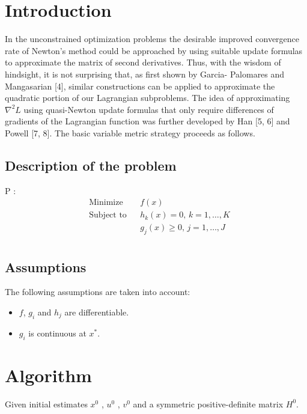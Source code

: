 \documentclass{article}
\begin{document}
\section{Introduction}

In the unconstrained optimization problems the desirable improved convergence rate of Newton’s method could be approached by using suitable update formulas to approximate the matrix of second derivatives. Thus, with the wisdom of hindsight, it is not surprising that, as first shown by Garcia- Palomares and Mangasarian [4], similar constructions can be applied to approximate the quadratic portion of our Lagrangian subproblems. The idea of approximating $\nabla^2L$ using quasi-Newton update formulas that only require differences of gradients of the Lagrangian function was further developed by Han [5, 6] and Powell [7, 8]. The basic variable metric strategy proceeds as follows.

\subsection{Description of the problem}
P : 
\begin{equation*}
    \begin{aligned}
        & \text{Minimize}
        & & f(x) \\
        & \text{Subject to}
        & & h_k(x) = 0, \, k = 1, \ldots, K\\
        &&& g_j(x) \geq 0, \, j = 1, \ldots, J\\
    \end{aligned}
\end{equation*}


\subsection{Assumptions}
The following assumptions are taken into account:
\begin{itemize}
    \item $f$, $g_i$ and $h_j$ are differentiable.
    \item $g_i$ is continuous at $x^*$.
\end{itemize}

\section{Algorithm}

Given initial estimates $x^0$ , $u^0$ , $v^0$ and a symmetric positive-definite matrix $H^0$.\newline
\end{document}
